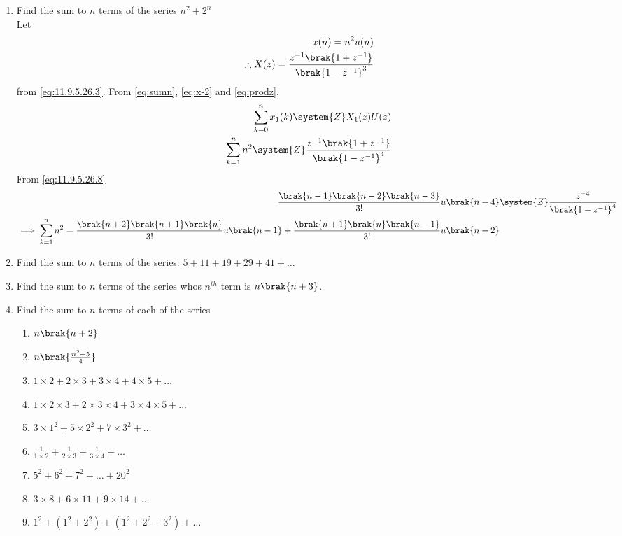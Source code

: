 \begin{enumerate}[label=\thesubsection.\arabic*,ref=\thesubsection.\theenumi]
%
\item Find the sum to $n$ terms of the series
$n^2 + 2^n$
\\
\solution
Let
\begin{align}
	\label{eq:x-1}
	x(n) = 
	n^2u(n)	
	\\
	\therefore
X(z)=
          \frac{z^{-1}\brak{1+z^{-1}}}{\brak{1-z^{-1}}^3}
\end{align}
from
\eqref{eq:11.9.5.26.3}.
From
	\eqref{eq:sumn},
	\eqref{eq:x-2}
	and 
\eqref{eq:prodz},
	\begin{align}
		\sum_{k=0}^{n}x_1(k) \system{Z} X_1(z)U(z)
	\\
        \sum_{k=1}^{n}n^2   \system{Z}\frac{z^{-1}\brak{1+z^{-1}}}{\brak{1-z^{-1}}^4}
	\end{align}
From
\eqref{eq:11.9.5.26.8}
\begin{align}
          \frac{\brak{n-1}\brak{n-2}\brak{n-3}}{3!}u\brak{n-4}&\system{Z} \frac{z^{-4}}{\brak{1-z^{-1}}^4}
	  \\
	  \implies
\sum_{k=1}^{n}n^2   
=
          \frac{\brak{n+2}\brak{n+1}\brak{n}}{3!}u\brak{n-1}
	  +
          \frac{\brak{n+1}\brak{n}\brak{n-1}}{3!}u\brak{n-2}
\end{align}
	\item Find the sum to $n$ terms of the series: $5+11+19+29+41+\dots$
	\item Find the sum to $n$ terms of the series whos $n^{th}$ term is $n\brak{n+3}$.
\item Find the sum to $n$ terms of each of the series
	\begin{multicols}{2}
		\begin{enumerate}[itemsep=1ex]
			\item $n\brak{n+2}$
			\item $n\brak{\frac{n^2+5}{4}}$
\item $1 \times 2 + 2 \times 3 + 3 \times 4 + 4 \times 5 +\dots $
\item $1 \times 2 \times 3 + 2 \times 3 \times 4 + 3 \times 4 \times 5 + \dots $
\item $3 \times 1^2 + 5 \times 2^2 + 7 \times 3^2 + \dots $
\item $\frac{1}{1 \times 2}+\frac{1}{2\times3}+\frac{1}{3\times4}+\dots $
\item $5^2 + 6^2 + 7^2 + \dots  + 20^2$
\item $3 \times 8 + 6 \times 11 + 9 \times 14 + \dots $
\item $1^2 + (1^2 + 2^2 ) + (1^2 + 2^2 + 3^2 ) + \dots $

\end{enumerate}
\end{multicols}
\end{enumerate}
